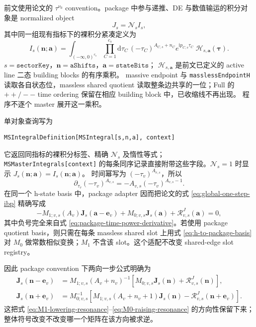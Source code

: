 \documentclass[11pt,a4paper]{ctexart}
\newcommand{\dd}{\mathrm d}
\newcommand{\ii}{\mathrm i}
\newcommand{\cR}{\mathcal R}
\newcommand{\cN}{\mathcal N}
\begin{document}
前文使用论文的 $\tau^{\nu_0}$ convention。package 中参与递推、DE 与数值输运的积分对象是 normalized object
\begin{equation}
 J_s=\cN_sI_s,
\end{equation}
其中同一组现有指标下的裸积分紧凑定义为
\begin{equation}
 I_s(\bm n;\bm a)=
 \int_{(-\infty,0)^{c_s}}
 \prod_{C=1}^{c_s}\!\dd\tau_C\,
 (-\tau_C)^{A_{C,s}+n_C}e^{\ii p_{C,s}\tau_C}
 \;\mathcal H_{s,\bm a}(\bm\tau).
 \label{eq:package-bare-integral}
\end{equation}
$s=\texttt{sectorKey}$，$\bm n=\texttt{aShifts}$，$\bm a=\texttt{stateBits}$；
$\mathcal H_{s,\bm a}$ 是前文已定义的 active line 二态 building blocks 的有序乘积。
massive endpoint 与 \texttt{masslessEndpointH} 读取各自状态位，massless shared quotient
读取整条边共享的一位；Full 的 $++/--$ time ordering 保留在相应 building block 中，已收缩线不再出现。
程序不逐个 master 展开这一乘积。

单对象查询写为
\begin{verbatim}
MSIntegralDefinition[MSIntegral[s,n,a], context]
\end{verbatim}
它返回同指标的裸积分标签、精确 $\cN_s$ 及惰性等式；
\texttt{MSMasterIntegrals[context]} 的每条同序记录直接附带这些字段。$\cN_s=1$ 时显示
$J_s(\bm n;\bm a)=I_s(\bm n;\bm a)$。
时间幂写为 $(-\tau_v)^{A_{v,s}}$，所以
\begin{equation}
 \partial_{\tau_v}(-\tau_v)^{A_{v,s}}
 =-A_{v,s}(-\tau_v)^{A_{v,s}-1}.
 \label{eq:package-time-power-derivative}
\end{equation}
在同一个 h-state basis 中，package adapter 因而把论文的式 \eqref{eq:global-one-step-ibp} 精确写成
\begin{equation}
 -M_{1;v,s}(A_v)\bm J_s(\bm a-\bm e_v)
 +M_{0;v,s}\bm J_s(\bm a)
 +\cR^{J}_{v,s}(\bm a)=0,
 \label{eq:package-one-step-ibp}
\end{equation}
其中负号完全来自式 \eqref{eq:package-time-power-derivative}。若使用 package quotient basis，则只需在每条 massless shared slot 上用式 \eqref{eq:h-to-package-basis} 对 $M_0$ 做常数相似变换；$M_1$ 不含该 slot。这个适配不改变 shared-edge slot registry。

因此 package convention 下两向一步公式明确为
\begin{align}
 \bm J_s(\bm n-\bm e_v)
 &=M_{1;v,s}(A_v+n_v)^{-1}
 \left[M_{0;v,s}\bm J_s(\bm n)+\cR^J_{v,s}(\bm n)\right],
 \label{eq:package-lowering}\\
 \bm J_s(\bm n+\bm e_v)
 &=M_{0;v,s}^{-1}
 \left[M_{1;v,s}(A_v+n_v+1)\bm J_s(\bm n)
 -\cR^J_{v,s}(\bm n+\bm e_v)\right].
 \label{eq:package-raising}
\end{align}
这把式 \eqref{eq:M1-lowering-resonance}--\eqref{eq:M0-raising-resonance} 的方向性保留下来；整体符号改变不改变哪一个矩阵在该方向被求逆。
\end{document}
